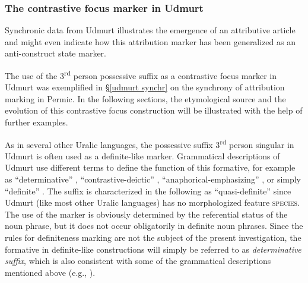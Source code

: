 \subsubsection{The contrastive focus marker in Udmurt}
\label{udmurt diachr}
Synchronic data from Udmurt illustrates the emergence of an attributive article and might even indicate how this attribution marker has been generalized as an anti\hyp{}construct state marker. 

The use of the 3\textsuperscript{rd} person possessive suffix as a contrastive focus marker in Udmurt was exemplified in \S\ref{udmurt synchr} on the synchrony of attribution marking in Permic. In the following sections, the etymological source and the evolution of this contrastive focus construction will be illustrated with the help of further examples.

As in several other Uralic languages, the possessive suffix 3\textsuperscript{rd} person singular in Udmurt is often used as a definite-like marker. Grammatical descriptions of Udmurt use different terms to define the function of this formative, for example as “determinative” \citep{kelmakov-etal1999}, “contrastive-deictic” \citep{alatyrev1970}, “anaphorical-emphasizing” \citep{kiekbaev1965}, or simply “definite” \citep{winkler2001}. The suffix is characterized in the following as “quasi-definite” since Udmurt (like most other Uralic languages) has no morphologized feature \textsc{species}. The use of the marker is obviously determined by the referential status of the noun phrase, but it does not occur obligatorily in definite noun phrases. Since the rules for definiteness marking are not the subject of the present investigation, the formative in definite-like constructions will simply be referred to as \textit{determinative suffix}, which is also consistent with some of the grammatical descriptions mentioned above (e.g., \citealt{kelmakov-etal1999}).

